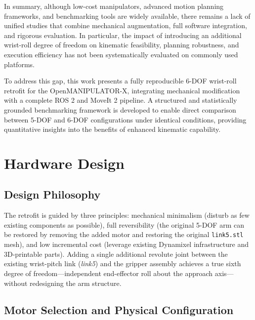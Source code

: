 \documentclass[conference]{IEEEtran}
\begin{document}
		In summary, although low-cost manipulators, advanced motion planning frameworks, and benchmarking tools are widely available, there remains a lack of unified studies that combine mechanical augmentation, full software integration, and rigorous evaluation. In particular, the impact of introducing an additional wrist-roll degree of freedom on kinematic feasibility, planning robustness, and execution efficiency has not been systematically evaluated on commonly used platforms.
		
		To address this gap, this work presents a fully reproducible 6-DOF wrist-roll retrofit for the OpenMANIPULATOR-X, integrating mechanical modification with a complete ROS 2 and MoveIt 2 pipeline. A structured and statistically grounded benchmarking framework is developed to enable direct comparison between 5-DOF and 6-DOF configurations under identical conditions, providing quantitative insights into the benefits of enhanced kinematic capability.
		
		
	\section{Hardware Design}
		
		\subsection{Design Philosophy}
		
		The retrofit is guided by three principles: mechanical minimalism
		(disturb as few existing components as possible), full reversibility
		(the original 5-DOF arm can be restored by removing the added motor
		and restoring the original \texttt{link5.stl} mesh), and low
		incremental cost (leverage existing Dynamixel infrastructure and
		3D-printable parts). Adding a single additional revolute joint between
		the existing wrist-pitch link (\textit{link5}) and the gripper
		assembly achieves a true sixth degree of freedom---independent
		end-effector roll about the approach axis---without redesigning the
		arm structure.
		
		\subsection{Motor Selection and Physical Configuration}
		
\end{document}
